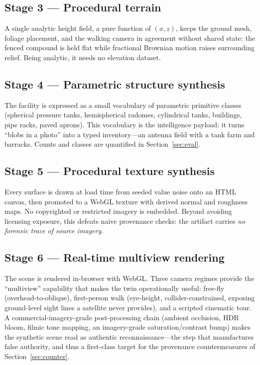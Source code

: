 \documentclass[conference]{IEEEtran}
\begin{document}
\subsection{Stage 3 --- Procedural terrain}
A single analytic height field, a pure function of $(x,z)$, keeps the ground mesh,
foliage placement, and the walking camera in agreement without shared state: the
fenced compound is held flat while fractional Brownian motion raises surrounding
relief. Being analytic, it needs no elevation dataset.

\subsection{Stage 4 --- Parametric structure synthesis}
The facility is expressed as a small vocabulary of parametric primitive classes
(spherical pressure tanks, hemispherical radomes, cylindrical tanks, buildings,
pipe racks, paved aprons). This vocabulary is the intelligence payload: it turns
``blobs in a photo'' into a typed inventory---an antenna field with a tank farm
and barracks. Counts and classes are quantified in Section~\ref{sec:eval}.

\subsection{Stage 5 --- Procedural texture synthesis}
Every surface is drawn at load time from seeded value noise onto an HTML canvas,
then promoted to a WebGL texture with derived normal and roughness maps. No
copyrighted or restricted imagery is embedded. Beyond avoiding licensing exposure,
this defeats naive provenance checks: the artifact carries \emph{no forensic trace
of source imagery}.

\subsection{Stage 6 --- Real-time multiview rendering}
The scene is rendered in-browser with WebGL. Three camera regimes provide the
``multiview'' capability that makes the twin operationally useful: free-fly
(overhead-to-oblique), first-person walk (eye-height, collider-constrained,
exposing ground-level sight lines a satellite never provides), and a scripted
cinematic tour. A commercial-imagery-grade post-processing chain (ambient
occlusion, HDR bloom, filmic tone mapping, an imagery-grade saturation/contrast
bump) makes the synthetic scene read as authentic reconnaissance---the step that
manufactures false authority, and thus a first-class target for the provenance
countermeasures of Section~\ref{sec:counter}.
\end{document}
